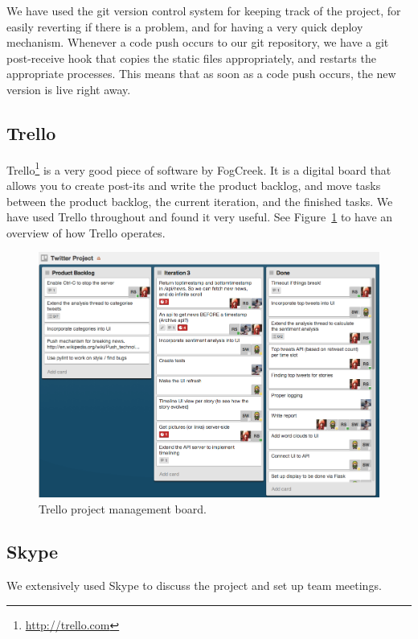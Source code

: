 \documentclass{report}
\begin{document}
			We have used the git version control system for keeping track of the project, for easily reverting if there is a problem, and for having a very quick deploy mechanism. Whenever a code push occurs to our git repository, we have a git post-receive hook that copies the static files appropriately, and restarts the appropriate processes. This means that as soon as a code push occurs, the new version is live right away.
		
			\subsection{Trello}
		
			Trello\footnote{\url{http://trello.com}} is a very good piece of software by FogCreek. It is a digital board that allows you to create post-its and write the product backlog, and move tasks between the product backlog, the current iteration, and the finished tasks. We have used Trello throughout and found it very useful. See Figure~\ref{fig:trello} to have an overview of how Trello operates.
			
			\begin{figure}
			 \includegraphics[scale=0.4]{trello.png}
			 \caption{\label{fig:trello} Trello project management board.}
			\end{figure}
		
			\subsection{Skype}
		
			We extensively used Skype to discuss the project and set up team meetings.
			
\end{document}
